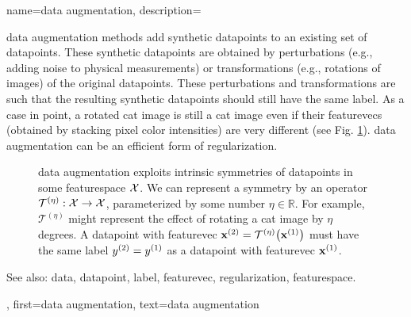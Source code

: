 {name={data augmentation},
	description={\Gls{data} augmentation methods add synthetic \glspl{datapoint} 
		to an existing set of \glspl{datapoint}. These synthetic \glspl{datapoint} are obtained by 
		perturbations (e.g., adding noise to physical measurements) or transformations 
		(e.g., rotations of images) of the original \glspl{datapoint}. These perturbations and 
		transformations are such that the resulting synthetic \glspl{datapoint} should 
		still have the same \gls{label}. As a case in point, a rotated cat image is still 
		a cat image even if their \glspl{featurevec} (obtained by stacking pixel color intensities) 
		are very different (see Fig. \ref{fig_symmetry_dataaug_dict}). \Gls{data} augmentation can be an 
		efficient form of \gls{regularization}.
		\begin{figure}[H]
		\begin{center}
			  \vspace*{-11mm}
		\end{center}
		\caption{\Gls{data} augmentation exploits intrinsic symmetries of \glspl{datapoint} in 
		    some \gls{featurespace} $\mathcal{X}$. We can represent a symmetry by 
		    an operator $\mathcal{T}^{(\eta)}: \mathcal{X} \rightarrow \mathcal{X}$,
		    parameterized by some number $\eta \in \mathbb{R}$. For example, $\mathcal{T}^{(\eta)}$ 
		    might represent the effect of rotating a cat image by $\eta$ degrees. A \gls{datapoint} 
		    with \gls{featurevec} ${\bf x}^{(2)} = \mathcal{T}^{(\eta)} \big({\bf x}^{(1)} \big)$ must 
		    have the same \gls{label} $y^{(2)}=y^{(1)}$ as a \gls{datapoint} 
		    with \gls{featurevec} ${\bf x}^{(1)}$.\label{fig_symmetry_dataaug_dict}}
		 \end{figure}
		See also: \gls{data}, \gls{datapoint}, \gls{label}, \gls{featurevec}, \gls{regularization}, \gls{featurespace}. },
	first={data augmentation},
	text={data augmentation}
}
	

